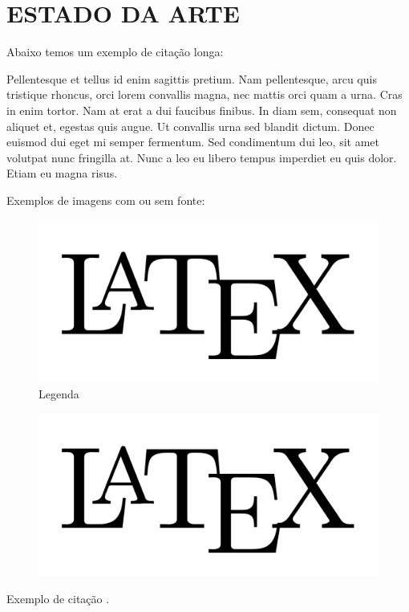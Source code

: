 \chapter{ESTADO DA ARTE}
\label{cap:estadoarte}

Abaixo temos um exemplo de citação longa:

\begin{citado}
Pellentesque et tellus id enim sagittis pretium. Nam pellentesque, arcu quis tristique rhoncus, orci lorem convallis magna, nec mattis orci quam a urna. Cras in enim tortor. Nam at erat a dui faucibus finibus. In diam sem, consequat non aliquet et, egestas quis augue. Ut convallis urna sed blandit dictum. Donec euismod dui eget mi semper fermentum. Sed condimentum dui leo, sit amet volutpat nunc fringilla at. Nunc a leo eu libero tempus imperdiet eu quis dolor. Etiam eu magna risus. 
\end{citado}

Exemplos de imagens com ou sem fonte:

\begin{figure}[!htp]
    \centering
    \includegraphics[scale=0.1]{Images/logo.png}
    \caption{Legenda}
    \label{fig:my_label}
\end{figure}
\begin{figure}[!htp]
    \centering
    \includegraphics[scale=0.1]{Images/logo.png}
    \label{fig:label2}
\end{figure}

Exemplo de citação \cite{Scott2014}.

